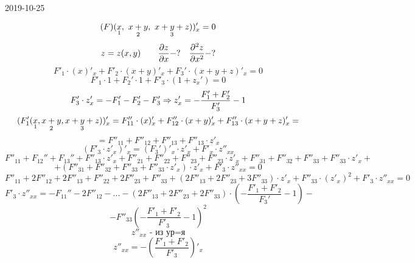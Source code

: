 \documentclass[matan.tex]{subfiles}
\begin{document}
\begin{lect}{2019-10-25}
    \begin{Task} [3]
        \[(F)(\underset{1}{x}, \ \underset{2}{x + y}, \  \underset{3}{x + y + z}))'_x = 0\]
        \[z = z(x, y) \qquad \frac{\partial z}{\partial x} - ? \quad
         \frac{\partial ^2 z}{\partial x^2} - ?\]
         \[F'_1 \cdot (x)'_x + F'_2 \cdot (x + y)'_x + F_3' \cdot (x + y + z)'_x = 0\]
         \[F'_1 \cdot 1 + F_2' \cdot 1 + F'_3 \cdot (1 + z_x') = 0\]
         \[F'_3 \cdot z'_x = -F_1' - F'_2  - F'_3 \Rightarrow z'_x = -\frac{F'_1 + F'_2}{F'_3}
         - 1\]
         \[(F_1'(\underset{1}{x}, \underset{2}{x + y}, \underset{3}{x + y + z}))'_x = 
         F''_{11} \cdot (x)'_x + F''_{12} \cdot (x + y)'_x + F_{13}'' \cdot 
         (x + y + z)'_x =\]
         \[ = F''_{11} + F''_{12} + F''_{13} + F''_{13} \cdot z'_x\]
         \[(F'_3 \cdot z'_x)'_x = (F_3')'_{x} \cdot z'_x + F'_x \cdot z''_{xx}  \]
         \[F''_{11} + F_{12}'' + F_{13}'' + F''_{13} \cdot z'_x  + 
         F''_{21} + F''_{22} + F''_{23} + F''_{23} \cdot z'_x + 
         F''_{31} + F''_{32} + F''_{33} + F''_{33} \cdot z'_x + \]
         \[+ (F''_{31} + F''_{32} + F''_{33} + F''_{33}\cdot z'_x) \cdot z'_x  + 
         F'_3 \cdot z''_{xx} = 0 \]
         \[F''_{11} + 2F''_{12} + 2F''_{13} + F''_{22} + 2F''_{23} + F''_{33} + 
         (2F''_{13} + 2F''_{23} + 3F''_{33}  ) \cdot z'_x + F''_{33} \cdot(z'_x)^2 + 
         F'_3 \cdot z''_{xx} = 0 \]
         \[F'_3 \cdot z''_{xx} = -F_{11}'' - 2F''_{12} - ... - 
         (2F''_{13} + 2F''_{23} + 2F''_{33}) \cdot (- \frac{F'_1 + F'_2}{F_3'} - 1) - \]
         \[ - F''_{33} (-\frac{F'_1 + F'_2}{F'_3} - 1)^2 \]
         \[z''_{xx} \text{ - из ур=я} \]
         \[z''_{xx} = - (\frac{F'_1  + F'_2}{F'_3})'_x \]
    \end{Task}


\end{lect}
\end{document}
